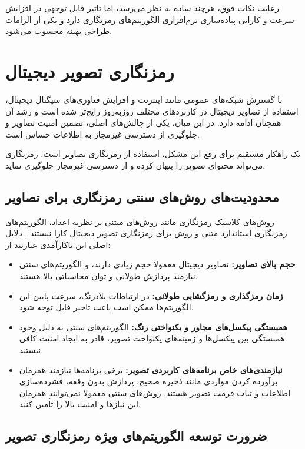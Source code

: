رعایت نکات فوق، هرچند ساده به نظر می‌رسد، اما تاثیر قابل توجهی در افزایش سرعت و کارایی پیاده‌سازی نرم‌افزاری الگوریتم‌های رمزنگاری دارد و یکی از الزامات طراحی بهینه محسوب می‌شود.

\section{رمزنگاری تصویر دیجیتال}

با گسترش شبکه‌های عمومی مانند اینترنت و افزایش فناوری‌های سیگنال دیجیتال، استفاده از تصاویر دیجیتال در کاربردهای مختلف روزبه‌روز رایج‌تر شده است و رشد آن همچنان ادامه دارد\cite{ref39}. در این میان، یکی از چالش‌های اصلی، تضمین امنیت تصاویر و جلوگیری از دسترسی غیرمجاز به اطلاعات حساس است.

یک راهکار مستقیم برای رفع این مشکل، استفاده از رمزنگاری تصاویر است. رمزنگاری می‌تواند محتوای تصویر را پنهان کرده و از دسترسی غیرمجاز جلوگیری نماید.

\subsection{محدودیت‌های روش‌های سنتی رمزنگاری برای تصاویر}

روش‌های کلاسیک رمزنگاری مانند روش‌های مبتنی بر نظریه اعداد، الگوریتم‌های رمزنگاری استاندارد متنی و روش  برای رمزنگاری تصویر دیجیتال کارا نیستند \cite{ref40}. دلایل اصلی این ناکارآمدی عبارتند از:

\begin{itemize}
    \item \textbf{حجم بالای تصاویر:} تصاویر دیجیتال معمولا حجم زیادی دارند، و الگوریتم‌های سنتی نیازمند پردازش طولانی و توان محاسباتی بالا هستند.
    \item \textbf{زمان رمزگذاری و رمزگشایی طولانی:} در ارتباطات بلادرنگ، سرعت پایین این الگوریتم‌ها ممکن است باعث تاخیر قابل توجه شود.
    \item \textbf{همبستگی پیکسل‌های مجاور و یکنواختی رنگ:} الگوریتم‌های سنتی به دلیل وجود همبستگی بین پیکسل‌ها و زمینه‌های یکنواخت تصویر، قادر به ایجاد امنیت کافی نیستند.
    \item \textbf{نیازمندی‌های خاص برنامه‌های کاربردی تصویر:} برخی برنامه‌ها نیازمند همزمان برآورده کردن مواردی مانند ذخیره صحیح، پردازش بدون وقفه، فشرده‌سازی اطلاعات و ثبات فرمت تصویر هستند. روش‌های سنتی معمولا نمی‌توانند همزمان این نیازها و امنیت بالا را تأمین کنند.
\end{itemize}

\subsection{ضرورت توسعه الگوریتم‌های ویژه رمزنگاری تصویر}

